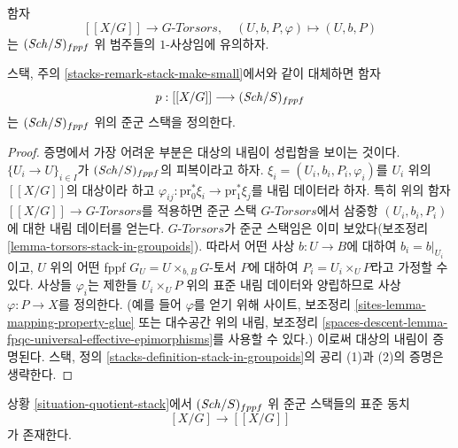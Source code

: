\medskip\noindent
함자
$$
[[X/G]] \longrightarrow G\textit{-Torsors},
\quad
(U, b, P, \varphi) \longmapsto (U, b, P)
$$
는 $(\mathit{Sch}/S)_{fppf}$ 위 범주들의 $1$-사상임에 유의하자.

\begin{lemma}
\label{lemma-group-quotient-stack-in-groupoids}
스택, 주의 \ref{stacks-remark-stack-make-small}에서와 같이 대체하면 함자
$$
p : [[X/G]] \longrightarrow (\mathit{Sch}/S)_{fppf}
$$
는 $(\mathit{Sch}/S)_{fppf}$ 위의 준군 스택을 정의한다.
\end{lemma}

\begin{proof}
증명에서 가장 어려운 부분은 대상의 내림이 성립함을 보이는 것이다.
$\{U_i \to U\}_{i \in I}$가 $(\mathit{Sch}/S)_{fppf}$의 피복이라고 하자.
$\xi_i = (U_i, b_i, P_i, \varphi_i)$를 $U_i$ 위의 $[[X/G]]$의 대상이라 하고
$\varphi_{ij} : \text{pr}_0^*\xi_i \to \text{pr}_1^*\xi_j$를 내림 데이터라
하자. 특히 위의 함자 $[[X/G]] \to G\textit{-Torsors}$를 적용하면 준군
스택 $G\textit{-Torsors}$에서 삼중항 $(U_i, b_i, P_i)$에 대한 내림 데이터를
얻는다. $G\textit{-Torsors}$가 준군 스택임은 이미 보았다(보조정리
\ref{lemma-torsors-stack-in-groupoids}). 따라서 어떤 사상 $b : U \to B$에
대하여 $b_i = b|_{U_i}$이고, $U$ 위의 어떤 fppf
$G_U = U \times_{b, B} G$-토서 $P$에 대하여 $P_i = U_i \times_U P$라고
가정할 수 있다. 사상들 $\varphi_i$는 제한들 $U_i \times_U P$ 위의 표준
내림 데이터와 양립하므로 사상 $\varphi : P \to X$를 정의한다. (예를 들어
$\varphi$를 얻기 위해 사이트, 보조정리
\ref{sites-lemma-mapping-property-glue} 또는 대수공간 위의 내림, 보조정리
\ref{spaces-descent-lemma-fpqc-universal-effective-epimorphisms}를 사용할 수
있다.) 이로써 대상의 내림이 증명된다. 스택, 정의
\ref{stacks-definition-stack-in-groupoids}의 공리 (1)과 (2)의 증명은 생략한다.
\end{proof}

\begin{proposition}
\label{proposition-equal-quotient-stacks}
상황 \ref{situation-quotient-stack}에서 $(\mathit{Sch}/S)_{fppf}$ 위 준군 스택들의
표준 동치
$$
[X/G] \longrightarrow [[X/G]]
$$
가 존재한다.
\end{proposition}

